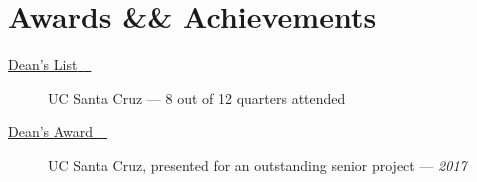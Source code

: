 \documentclass[10pt]{article}
\let\orighref\href
\renewcommand{\href}[2]{\orighref{#1}{#2{\scriptsize~\color{darkgray}\faExternalLink}}}
\begin{document}
\section*{Awards \&\& Achievements}
\begin{description}
  \item[\href{https://honors.ucsc.edu/honors-programs/deans-honors}{Dean's List}] UC Santa Cruz --- 8 out of 12 quarters attended
  \item[\href{https://ua.soe.ucsc.edu/honors/2016-2017}{Dean's Award}] UC Santa
    Cruz, presented for an outstanding senior project --- \textit{2017}
\end{description}
\end{document}
